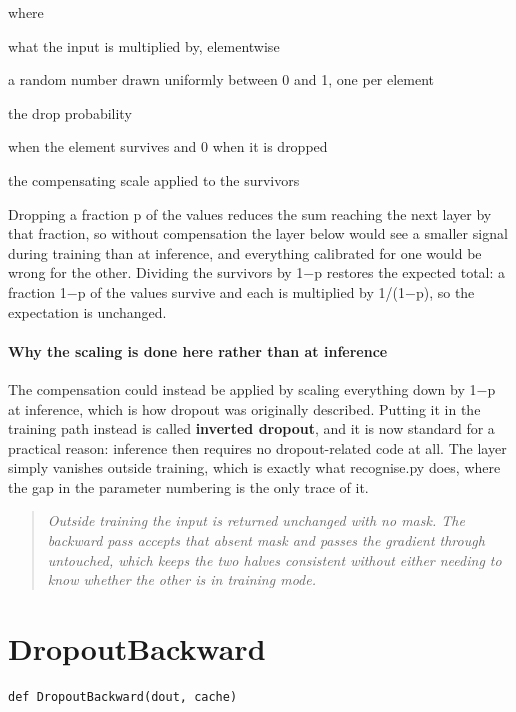 \noindent where
\begin{description}[leftmargin=2.4em,style=nextline,font=\normalfont\ttfamily]\setlength\itemsep{1pt}
  \item[{$\mathrm{mask}$}] \normalfont what the input is multiplied by, elementwise
  \item[{$u$}] \normalfont a random number drawn uniformly between 0 and 1, one per element
  \item[{$p$}] \normalfont the drop probability
  \item[{$[\,u \ge p\,]$}]  when the element survives and 0 when it is dropped
  \item[{$\frac{1}{1-p}$}] \normalfont the compensating scale applied to the survivors
\end{description}
Dropping a fraction p of the values reduces the sum reaching the next layer by that fraction, so without compensation the layer below would see a smaller signal during training than at inference, and everything calibrated for one would be wrong for the other. Dividing the survivors by 1$-$p restores the expected total: a fraction 1$-$p of the values survive and each is multiplied by 1/(1$-$p), so the expectation is unchanged.


\paragraph{Why the scaling is done here rather than at inference}
The compensation could instead be applied by scaling everything down by 1$-$p at inference, which is how dropout was originally described. Putting it in the training path instead is called \textbf{inverted dropout}, and it is now standard for a practical reason: inference then requires no dropout-related code at all. The layer simply vanishes outside training, which is exactly what recognise.py does, where the gap in the parameter numbering is the only trace of it.


\begin{quote}\small\itshape Outside training the input is returned unchanged with no mask. The backward pass accepts that absent mask and passes the gradient through untouched, which keeps the two halves consistent without either needing to know whether the other is in training mode.\end{quote}

\section{DropoutBackward}
\begin{lstlisting}[style=sig]
def DropoutBackward(dout, cache)
\end{lstlisting}

